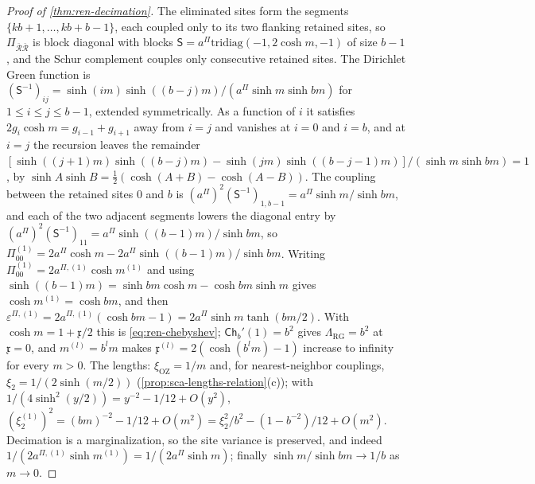 \begin{proof}[Proof of \cref{thm:ren-decimation}]
The eliminated sites form the segments $\{kb+1,\dots,kb+b-1\}$, each coupled only to its two flanking retained sites, so $\Pi_{\bar{\mathcal R}\bar{\mathcal R}}$ is block diagonal with blocks $\mathsf S=a^\Pi\mathrm{tridiag}(-1,2\cosh m,-1)$ of size $b-1$, and the Schur complement couples only consecutive retained sites. The Dirichlet Green function is $(\mathsf S^{-1})_{ij}=\sinh(im)\sinh((b-j)m)/(a^\Pi\sinh m\sinh bm)$ for $1\le i\le j\le b-1$, extended symmetrically. As a function of $i$ it satisfies $2g_i\cosh m=g_{i-1}+g_{i+1}$ away from $i=j$ and vanishes at $i=0$ and $i=b$, and at $i=j$ the recursion leaves the remainder $[\sinh((j+1)m)\sinh((b-j)m)-\sinh(jm)\sinh((b-j-1)m)]/(\sinh m\sinh bm)=1$, by $\sinh A\sinh B=\frac12(\cosh(A+B)-\cosh(A-B))$. The coupling between the retained sites $0$ and $b$ is $(a^\Pi)^2(\mathsf S^{-1})_{1,b-1}=a^\Pi\sinh m/\sinh bm$, and each of the two adjacent segments lowers the diagonal entry by $(a^\Pi)^2(\mathsf S^{-1})_{11}=a^\Pi\sinh((b-1)m)/\sinh bm$, so $\Pi^{(1)}_{00}=2a^\Pi\cosh m-2a^\Pi\sinh((b-1)m)/\sinh bm$. Writing $\Pi^{(1)}_{00}=2a^{\Pi,(1)}\cosh m^{(1)}$ and using $\sinh((b-1)m)=\sinh bm\cosh m-\cosh bm\sinh m$ gives $\cosh m^{(1)}=\cosh bm$, and then $\varepsilon^{\Pi,(1)}=2a^{\Pi,(1)}(\cosh bm-1)=2a^\Pi\sinh m\tanh(bm/2)$. With $\cosh m=1+\mathfrak x/2$ this is \eqref{eq:ren-chebyshev}; $\mathsf{Ch}_b'(1)=b^2$ gives $\Lambda_{\mathrm{RG}}=b^2$ at $\mathfrak x=0$, and $m^{(l)}=b^lm$ makes $\mathfrak x^{(l)}=2(\cosh(b^lm)-1)$ increase to infinity for every $m>0$. The lengths: $\xi_{\mathrm{OZ}}=1/m$ and, for nearest-neighbor couplings, $\xi_2=1/(2\sinh(m/2))$ (\cref{prop:sca-lengths-relation}(c)); with $1/(4\sinh^2(y/2))=y^{-2}-1/12+O(y^2)$, $(\xi^{(1)}_2)^2=(bm)^{-2}-1/12+O(m^2)=\xi_2^2/b^2-(1-b^{-2})/12+O(m^2)$. Decimation is a marginalization, so the site variance is preserved, and indeed $1/(2a^{\Pi,(1)}\sinh m^{(1)})=1/(2a^\Pi\sinh m)$; finally $\sinh m/\sinh bm\to1/b$ as $m\to0$.
\end{proof}

